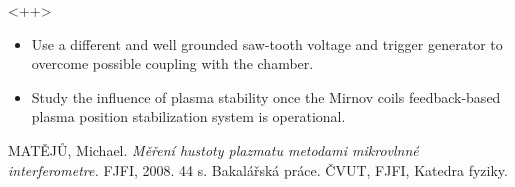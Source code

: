 \documentclass[portrait,final,a0paper]{baposter}
\def\bi{\begin{itemize}}
\def\ei{\end{itemize}}
\def\im{\item}
\newcommand{\compresslist}{%
\setlength{\itemsep}{1pt}%
\setlength{\parskip}{0pt}%
\setlength{\parsep}{0pt}%
}
\begin{document}
\begin{poster}
 {
 }<++>
{
\begin{itemize}
        \compresslist
    \item Use a different and well grounded saw-tooth voltage and trigger generator to overcome possible coupling with the chamber.
    \item Study the influence of plasma stability once the Mirnov coils feedback-based plasma position stabilization system is operational.
\end{itemize}
}


{
 MATĚJŮ, Michael. {\em Měření hustoty plazmatu metodami mikrovlnné interferometre.} FJFI, 2008. 44 s. Bakalářská práce. ČVUT, FJFI, Katedra fyziky.
 
}

\end{poster}
\end{document}
